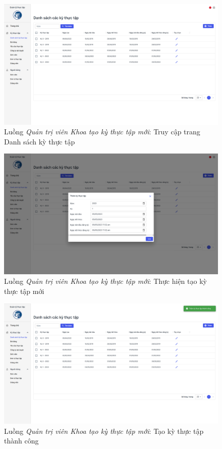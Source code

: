 \documentclass[./../main.tex]{subfiles}
\begin{document}
\begin{figure}[]
	\includegraphics[width=\linewidth]{./images/image53.png}
	\caption{Luồng \emph{Quản trị viên Khoa tạo kỳ thực tập mới}: Truy cập trang Danh sách kỳ thực tập}
	\label{fig:org_admin_access_list_terms}
\end{figure}

\begin{figure}[]
	\includegraphics[width=\linewidth]{./images/image54.png}
	\caption{Luồng \emph{Quản trị viên Khoa tạo kỳ thực tập mới}: Thực hiện tạo kỳ thực tập mới}
	\label{fig:org_admin_add_term}
\end{figure}

\begin{figure}[]
	\includegraphics[width=\linewidth]{./images/image55.png}
	\caption{Luồng \emph{Quản trị viên Khoa tạo kỳ thực tập mới}: Tạo kỳ thực tập thành công}
	\label{fig:org_admin_add_term_success}
\end{figure}
\end{document}
